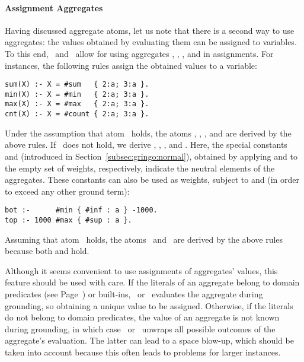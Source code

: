 \paragraph{Assignment Aggregates}
Having discussed aggregate atoms,
let us note that there is a second way to use aggregates:
the values obtained by evaluating them can be assigned to variables.
To this end, \gringo\ and \clingo\ allow for using aggregates
, , , and  in assignments.
%
%
For instances, the following rules assign the obtained values to a variable:
\begin{lstlisting}[numbers=none]
sum(X) :- X = #sum   { 2:a; 3:a }.
min(X) :- X = #min   { 2:a; 3:a }.
max(X) :- X = #max   { 2:a; 3:a }.
cnt(X) :- X = #count { 2:a; 3:a }.
\end{lstlisting}
Under the assumption that atom~ holds,
the atoms , ,
, and  are
derived by the above rules.
If~ does not hold, we derive
, ,
, and .
%
Here, the special constants  and 
(introduced in Section~\ref{subsec:gringo:normal}),
obtained by applying  and  to the empty set of weights, respectively,
indicate the neutral elements of the aggregates.
%
These constants can also be used as weights, subject to
 and  (in order to exceed any other ground term):
\begin{lstlisting}[numbers=none]
bot :-      #min { #inf : a } -1000.
top :- 1000 #max { #sup : a }.
\end{lstlisting}
Assuming that atom~ holds,
the atoms~ and~ are derived by the above rules
because both  and  hold.

\begin{note}\label{rem:aggr-assign}
Although it seems convenient to use assignments of aggregates' values,
this feature should be used with care.
If the literals of an aggregate belong to domain predicates
(see Page~\pageref{pg:domain}) or built-ins,
\gringo\ or \clingo\ evaluates the aggregate during grounding, so obtaining
a unique value to be assigned.
%
%
Otherwise, if the literals do not belong to domain predicates,
the value of an aggregate is not known during grounding,
in which case \gringo\ or \clingo\ unwraps all possible outcomes of the
aggregate's evaluation.
The latter can lead to a space blow-up,
which should be taken into account
because this often leads to problems for larger instances.
\end{note}

